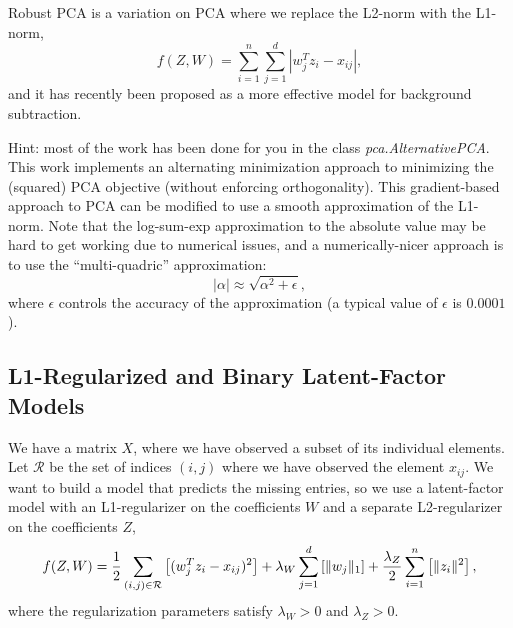 \documentclass{article}
\begin{document}
Robust PCA is a variation on PCA where we replace the L2-norm with the L1-norm,
\[
f(Z,W) = \sum_{i=1}^n\sum_{j=1}^d |w_j^Tz_i - x_{ij}|,
\]
and it has recently been proposed as a more effective model for background subtraction. 

Hint: most of the work has been done for you in the class \emph{pca.AlternativePCA}. This work implements an alternating minimization approach to minimizing the (squared) PCA objective (without enforcing orthogonality). This gradient-based approach to PCA can be modified to use a smooth approximation of the L1-norm. Note that the log-sum-exp approximation to the absolute value may be hard to get working due to numerical issues, and a numerically-nicer approach is to use the ``multi-quadric'' approximation:
\[
|\alpha| \approx \sqrt{\alpha^2 + \epsilon},
\]
where $\epsilon$ controls the accuracy of the approximation (a typical value of $\epsilon$ is $0.0001$).


\subsection{L1-Regularized and Binary Latent-Factor Models}

We have a matrix $X$, where we have observed a subset of its individual elements. Let $\mathcal{R}$ be the set of indices $(i,j)$ where we have observed the element $x_{ij}$. We want to build a model that predicts the missing entries, so we use a latent-factor model with an L1-regularizer on the coefficients $W$ and a separate L2-regularizer on the coefficients $Z$,
\[
f(Z,W) = \frac{1}{2}\sum_{(i,j) \in \mathcal{R}}\left[(w_j^Tz_i - x_{ij})^2 \right] + \lambda_W \sum_{j=1}^d \left[\|w_j\|_1\right] + \frac{\lambda_Z}{2} \sum_{i=1}^n \left[\|z_i\|^2\right],
\]
where the regularization parameters satisfy $\lambda_W > 0$ and $\lambda_Z > 0$.

\end{document}
